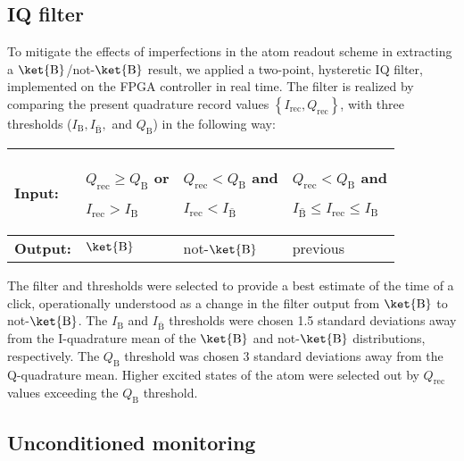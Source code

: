 \subsection{IQ filter \label{subsec:IQ-filter}}

To mitigate the effects of imperfections in the atom readout scheme
in extracting a $\ket{\mathrm{B}}$/not-$\ket{\mathrm{B}}$ result,
we applied a two-point, hysteretic IQ filter, implemented on the FPGA
controller in real time. The filter is realized by comparing the present
quadrature record values $\left\{ I_{\mathrm{rec}},Q_{\mathrm{rec}}\right\} $,
with three thresholds ($I_{\mathrm{B}},I_{\bar{\mathrm{B}}},$ and
$Q_{\mathrm{B}}$) in the following way: 
\begin{center}
\begin{tabular}{>{\raggedleft}m{20mm}|>{\centering}p{30mm}|>{\centering}p{30mm}|>{\centering}p{30mm}}
\textbf{Input: } & $Q_{\mathrm{rec}}\geq Q_{\mathrm{B}}$ or

$I_{\mathrm{rec}}>I_{\mathrm{B}}$  & $Q_{\mathrm{rec}}<Q_{\mathrm{B}}$ and

$I_{\mathrm{rec}}<I_{\bar{\mathrm{B}}}$  & $Q_{\mathrm{rec}}<Q_{\mathrm{B}}$ and

$I_{\bar{\mathrm{B}}}\leq I_{\mathrm{rec}}\leq I_{\mathrm{B}}$\tabularnewline
\hline 
\textbf{Output: } & $\ket{\mathrm{B}}$  & not-$\ket{\mathrm{B}}$  & previous\tabularnewline
\end{tabular}
\par\end{center}

\noindent The filter and thresholds were selected to provide a best
estimate of the time of a click, operationally understood as a change
in the filter output from $\ket{\mathrm{B}}$ to not-$\ket{\mathrm{B}}$.
The $I_{{\mathrm{B}}}$ and $I_{\bar{\mathrm{B}}}$ thresholds were
chosen 1.5 standard deviations away from the I-quadrature mean of
the $\ket{\mathrm{B}}$ and not-$\ket{\mathrm{B}}$ distributions,
respectively. The $Q_{{\mathrm{B}}}$ threshold was chosen 3 standard
deviations away from the Q-quadrature mean. Higher excited states
of the atom were selected out by $Q_{\mathrm{rec}}$ values exceeding
the $Q_{\mathrm{B}}$ threshold. 

\subsection{Unconditioned monitoring}

